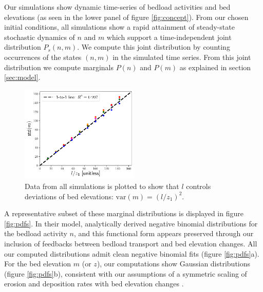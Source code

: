 \documentclass[draft]{agujournal2018}
\begin{document}
Our simulations show dynamic time-series of bedload activities and bed elevations (as seen in the lower panel of figure \ref{fig:concept}).
From our chosen initial conditions, all simulations show a rapid attainment of steady-state stochastic dynamics of $n$ and $m$ which support a time-independent joint distribution $P_s(n,m)$. 
We compute this joint distribution by counting occurrences of the states $(n,m)$ in the simulated time series.
From this joint distribution we compute marginals $P(n)$ and $P(m)$ as explained in section \ref{sec:model}.

\begin{figure}
	\centering
	\includegraphics[width=0.5\textwidth,keepaspectratio]{../figures/variance.pdf}
	\caption{Data from all simulations is plotted to show that $l$ controls deviations of bed elevations: $\text{var}(m) = (l/z_1)^2$. }
	\label{fig:var}
\end{figure}
A representative subset of these marginal distributions is displayed in figure \ref{fig:pdfs}.
In their model, \citet{Ancey2008} analytically derived negative binomial distributions for the bedload activity $n$, and this functional form appears preserved through our inclusion of feedbacks between bedload transport and bed elevation changes.
All our computed distributions admit clean negative binomial fits (figure \ref{fig:pdfs}a).
For the bed elevation $m$ (or $z$), our computations show Gaussian distributions (figure \ref{fig:pdfs}b), consistent with our assumptions of a symmetric scaling of erosion and deposition rates with bed elevation changes \citep[e.g.,][]{Wong2007}.
\end{document}

